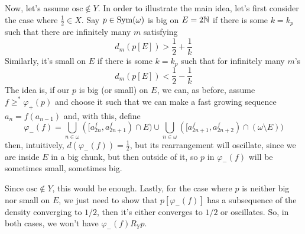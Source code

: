 \begin{sketch}
    Now, let's assume $\text{osc}\notin Y$. In order to illustrate the main idea, let's first consider the case where $\frac12\in X$. Say $p\in\mathrm{Sym}(\omega)$ is big on $E=2\mathbb{N}$ if there is some $k=k_p$ such that there are infinitely many $m$ satisfying
    \begin{equation}\label{eq_big_on_e}
        d_m(p[E])>\frac12+\frac1k
    \end{equation}
    Similarly, it's small on $E$ if there is some $k=k_p$ such that for infinitely many $m$'s
    \begin{equation}\label{eq_small_on_e}
        d_m(p[E])<\frac12-\frac1k
    \end{equation}
    The idea is, if our $p$ is big (or small) on $E$, we can, as before, assume $f\geq^*\varphi_+(p)$ and choose it such that we can make a fast growing sequence $a_n=f(a_{n-1})$ and, with this, define
    \begin{equation}\label{eq_phi_-_def}
        \varphi_-(f)=\bigcup_{n\in\omega}([a^f_{2n},a^f_{2n+1})\cap E)\cup\bigcup_{n\in\omega}([a^f_{2n+1},a^f_{2n+2})\cap(\omega\setminus E))
    \end{equation}
    then, intuitively, $d(\varphi_-(f))=\frac12$, but its rearrangement will oscillate, since we are inside $E$ in a big chunk, but then outside of it, so $p$ in $\varphi_-(f)$ will be sometimes small, sometimes big.

    Since $\text{osc}\notin Y$, this would be enough. Lastly, for the case where $p$ is neither big nor small on $E$, we just need to show that $p[\varphi_-(f)]$ has a subsequence of the density converging to $1/2$, then it's either converges to $1/2$ or oscillates. So, in both cases, we won't have $\varphi_-(f)R_Yp$.
\end{sketch}

